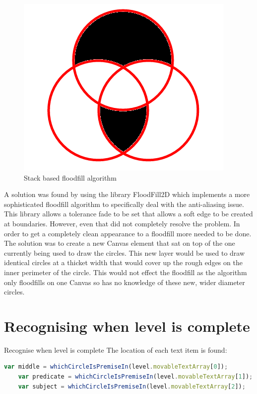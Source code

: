 \documentclass[12pt,a4paper]{report}
\begin{document}
\begin{figure}[h]
\centering
    \includegraphics[scale=0.5]{floodFillBad}
    \caption{Stack based floodfill algorithm}
    \label{fig:floodFillBad}
\end{figure}
\FloatBarrier

	A solution was found by using the library FloodFill2D which implements a more sophisticated floodfill algorithm to specifically deal with the anti-aliasing issue. This library allows a tolerance fade to be set that allows a soft edge to be created at boundaries. However, even that did not completely resolve the problem. In order to get a completely clean appearance to a floodfill more needed to be done. The solution was to create a new Canvas element that sat on top of the one currently being used to draw the circles. This new layer would be used to draw identical circles at a thicket width that would cover up the rough edges on the inner perimeter of the circle. This would not effect the floodfill as the algorithm only floodfills on one Canvas so has no knowledge of these new, wider diameter circles.

\section{Recognising when level is complete}
Recognise when level is complete
The location of each text item is found:
\begin{lstlisting}[language=JavaScript]
    var middle = whichCircleIsPremiseIn(level.movableTextArray[0]);
    var predicate = whichCircleIsPremiseIn(level.movableTextArray[1]);
    var subject = whichCircleIsPremiseIn(level.movableTextArray[2]);
\end{lstlisting}
\end{document}
